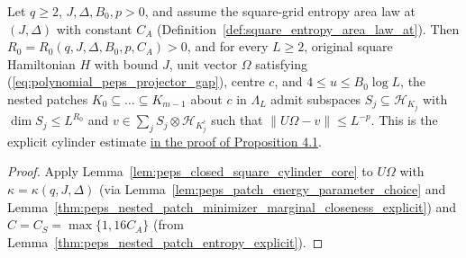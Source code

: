 \begin{lemma}
    \label{thm:peps_nested_patch_cylinder_approximation_explicit}
    \leanok
    Let $q\ge2$, $J,\Delta,B_0,p>0$, and assume the
    square-grid entropy area law at $(J,\Delta)$ with constant $C_A$ (Definition~\ref{def:square_entropy_area_law_at}).
    Then $R_0=R_0(q,J,\Delta,B_0,p,C_A)>0$, and for every $L\ge2$,
    original square Hamiltonian $H$ with bound $J$, unit vector $\Omega$ satisfying (\ref{eq:polynomial_peps_projector_gap}), centre $c$, and $4\le u\le B_0\log L$, the nested patches
    $K_0\subseteq\dots\subseteq K_{m-1}$ about $c$ in $\Lambda_L$ admit subspaces $S_j\subseteq\mathcal H_{K_j}$ with $\dim S_j\le L^{R_0}$ and $v\in\sum_j S_j\otimes\mathcal H_{K_j^c}$ such that
    $\|U\Omega-v\|\le L^{-p}$. This is the explicit cylinder estimate
    \href{https://github.com/openai/math/blob/adc7f1241b42e322a6451854ab7e4b4c146bf78a/preprints/Polynomial-PEPS-approximation-of-gapped-square-grid-ground-states-September-24-2026/build/sections/03-patches.tex\#L484-L563}{in the proof of Proposition 4.1}.
\end{lemma}
\begin{proof}
    \leanok
    Apply Lemma~\ref{lem:peps_closed_square_cylinder_core} to $U\Omega$ with $\kappa=\kappa(q,J,\Delta)$ (via Lemma~\ref{lem:peps_patch_energy_parameter_choice} and Lemma~\ref{thm:peps_nested_patch_minimizer_marginal_closeness_explicit}) and $C=C_S=\max\{1,16C_A\}$ (from Lemma~\ref{thm:peps_nested_patch_entropy_explicit}).
\end{proof}

